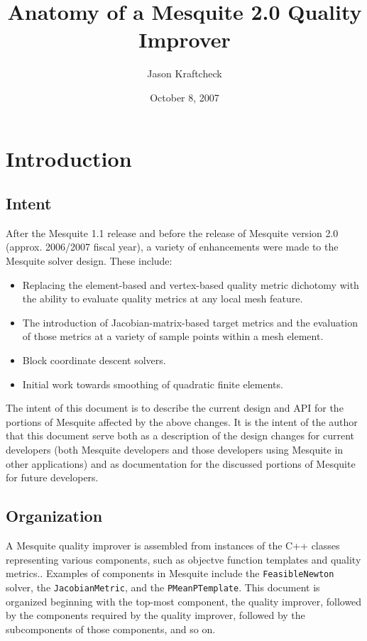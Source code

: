 \documentclass{article}
\author{Jason Kraftcheck}
\title{Anatomy of a Mesquite 2.0 Quality Improver}
\date{October 8, 2007}
\begin{document}
\maketitle
\tableofcontents
\listoffigures



\newenvironment{smallmargins}{\addtolength{\hoffset}{-1.0in}\addtolength{\textwidth}{2.0in} }{}

\section{Introduction}

\subsection{Intent}

After the Mesquite 1.1 release and before the release of Mesquite version 2.0 (approx. 2006/2007 fiscal year), a variety of enhancements were made to the Mesquite solver design.  These include:
\begin{itemize}
\item Replacing the element-based and vertex-based quality metric dichotomy with the ability to evaluate quality metrics at any local mesh feature.
\item The introduction of Jacobian-matrix-based target metrics and the evaluation of those metrics at a variety of sample points within a mesh element.
\item Block coordinate descent solvers.
\item Initial work towards smoothing of quadratic finite elements.  
\end{itemize}

The intent of this document is to describe the current design and API for the portions of Mesquite affected by the above changes.  It is the intent of the
author that this document serve both as a description of the design changes
for current developers (both Mesquite developers and those developers using Mesquite in other applications) and as documentation for the discussed portions of Mesquite for future developers.

\subsection{Organization}

A Mesquite quality improver is assembled from instances of the C++ classes representing various components, such as objectve function templates and quality metrics..  Examples of components in Mesquite include the \texttt{FeasibleNewton} solver, the \texttt{JacobianMetric}, and the \texttt{PMeanPTemplate}.  This document is organized beginning with the top-most component, the quality improver, followed by the components required by the quality improver, followed by the subcomponents of those components, and so on.
\end{document}
